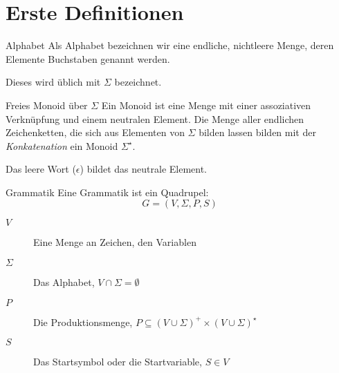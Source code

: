 \chapter{Erste Definitionen}
\begin{definition}{Alphabet}
	Als Alphabet bezeichnen wir eine endliche, nichtleere Menge, deren Elemente Buchstaben genannt werden.

	Dieses wird üblich mit $\Sigma$ bezeichnet.
\end{definition}

\begin{definition}{Freies Monoid über $\Sigma$}
	Ein Monoid ist eine Menge mit einer assoziativen Verknüpfung und einem neutralen Element. Die Menge aller endlichen Zeichenketten, die sich aus Elementen von $\Sigma$ bilden lassen bilden mit der \emph{Konkatenation} ein Monoid $\Sigma^\star$.

	Das leere Wort ($\epsilon$) bildet das neutrale Element.
\end{definition}


\begin{definition}{Grammatik}
	Eine Grammatik ist ein Quadrupel:
	\begin{equation*}
		G=(V,\Sigma, P, S)
	\end{equation*}
	\begin{description}
		\item[$V$] Eine Menge an Zeichen, den Variablen
		\item[$\Sigma$] Das Alphabet, $V\cap\Sigma =\emptyset$
		\item[$P$] Die Produktionsmenge, $P\subseteq(V\cup\Sigma)^+\times(V\cup\Sigma)^\star$
		\item[$S$] Das Startsymbol oder die Startvariable, $S\in V$
	\end{description}
\end{definition}
